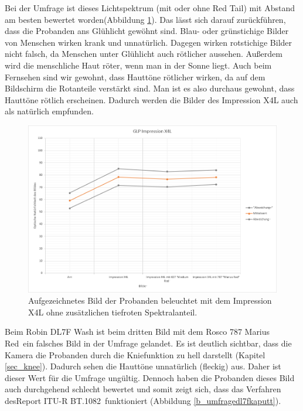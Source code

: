 \noindent Bei der Umfrage ist dieses Lichtspektrum (mit oder ohne \glqq Red Tail\grqq) mit Abstand am besten bewertet worden(Abbildung \ref{b_umfrageglp}). Das lässt sich darauf zurückführen, dass die Probanden ans Glühlicht gewöhnt sind. Blau- oder grünstichige Bilder von Menschen wirken krank und unnatürlich. Dagegen wirken rotstichige Bilder nicht falsch, da Menschen unter Glühlicht auch rötlicher aussehen. Außerdem wird die menschliche Haut röter, wenn man in der Sonne liegt. Auch beim Fernsehen sind wir gewohnt, dass Hauttöne rötlicher wirken, da auf dem Bildschirm die Rotanteile verstärkt sind. Man ist es also durchaus gewohnt, dass Hauttöne rötlich erscheinen. Dadurch werden die Bilder des Impression X4L auch als natürlich empfunden. 

\begin{figure}[H]     %
\centering
\includegraphics[width=1.0\textwidth]{bilder/umfrageglp} 
\caption {Aufgezeichnetes Bild der Probanden beleuchtet mit dem Impression X4L ohne zusätzlichen tiefroten Spektralanteil.} \label{b_umfrageglp}
\end{figure}

\noindent Beim Robin DL7F Wash ist beim dritten Bild mit dem Rosco 787 \glqq Marius Red\grqq\ ein falsches Bild in der Umfrage gelandet. Es ist deutlich sichtbar, dass die Kamera die Probanden durch die Kniefunktion zu hell darstellt (Kapitel \ref{sec_knee}). Dadurch sehen die Hauttöne unnatürlich (fleckig) aus. Daher ist dieser Wert für die Umfrage ungültig. Dennoch haben die Probanden dieses Bild auch durchgehend schlecht bewertet und somit zeigt sich, dass das Verfahren des\glqq Report ITU-R BT.1082\grqq\ funktioniert 
(Abbildung \ref{b_umfragedl7fkaputt}).

